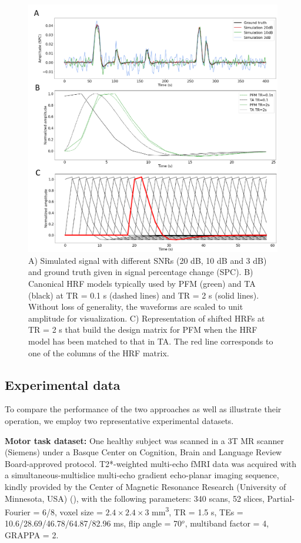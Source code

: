 \begin{figure}[H]
    \begin{center}
        \includegraphics[width=0.75\columnwidth]{figures/sim_and_hrf.pdf}
    \end{center}
    \caption{A) Simulated signal with different SNRs (20 dB, 10 dB and 3 dB) and ground truth given in signal percentage change (SPC). B) Canonical HRF models typically used by PFM (green) and TA (black) at TR = 0.1 s (dashed lines) and TR = 2 s (solid lines). Without loss of generality, the waveforms are scaled to unit amplitude for visualization. C) Representation of shifted HRFs at TR = 2 s that build the design matrix for PFM when the HRF model has been matched to that in TA. The red line corresponds to one of the columns of the HRF matrix. }
\label{fig:sim_and_hrf}
\end{figure}

\subsection{Experimental data}
To compare the performance of the two approaches as well as illustrate their operation, we employ two representative experimental datasets.

\textbf{Motor task dataset:} One healthy subject was scanned in a 3T MR scanner (Siemens) under a Basque Center on Cognition, Brain and Language Review Board-approved protocol. T2*-weighted multi-echo fMRI data was acquired with a simultaneous-multislice multi-echo gradient echo-planar imaging sequence, kindly provided by the Center of Magnetic Resonance Research (University of Minnesota, USA) (\citealt{Feinberg_2010,Moeller_2010,Setsompop_2011}), with the following parameters: 340 scans, 52 slices, Partial-Fourier = 6/8, voxel size = $2.4\times2.4\times3$ mm\textsuperscript{3}, TR = 1.5 s, TEs = 10.6/28.69/46.78/64.87/82.96 ms, flip angle = 70\(^o\), multiband factor = 4, GRAPPA = 2.


